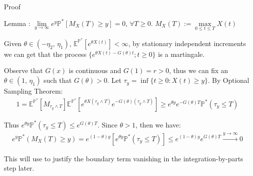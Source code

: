 \documentclass{beamer}
\begin{document}
\begin{frame}{Proof}

    {\footnotesize \footnotesize
    \par Lemma :  \(\lim\limits_{y\to\infty}e^{y}\mathbb{P}^{*}[M_{X}(T)\geq y]=0\), \(\forall T\geq 0\). \(M_{X}(T):=\max\limits_{0\leq t\leq T}X(t)\)
    \par [Proof]
    \vspace{1em}
    \par Given \(\theta\in(-\eta_{2},\,\eta_{1})\), $\mathbb{E}^{\mathbb{P}^*}[e^{\theta X(t)}]<\infty$, 
    by stationary independent increments we can get that the process \(\{e^{\theta X(t)-G(\theta)t}; t\geq 0\}\) is a martingale.
     \vspace{1em}
    \par  \pause Observe that $G(x)$ is continuous and \(G(1)=r>0\), thus we can fix an \(\theta\in(1,\,\eta_{1})\) such that \(G(\theta)>0\).
     Let $\tau_y = \inf\{t \geq 0 : X(t) \geq y\}$. By Optional Sampling Theorem:
      \vspace{1em}
    \begin{align*}
      1 = \mathbb{E}^{\mathbb{P}^*}[M_{\tau_y \land T}]  \mathbb{E}^{\mathbb{P}^*} \left[ e^{\theta X(\tau_y \land T)} e^{-G(\theta)(\tau_y \land T)} \right] 
      \geq e^{\theta y} e^{-G(\theta)T} \mathbb{P}^* (\tau_y \leq T)
    \end{align*}
     \vspace{1em}
    \par  \pause Thus $e^{\theta y} \mathbb{P}^* (\tau_y \leq T) \leq e^{G(\theta)T}$. Since $\theta > 1$, then we have:
     \vspace{1em}
    \begin{align*}
      e^y \mathbb{P}^* (M_X(T) \geq y) = 
      e^{(1-\theta)y} \left[ e^{\theta y} \mathbb{P}^* (\tau_y \leq T) \right] \leq e^{(1-\theta)y} e^{G(\theta)T} \xrightarrow{y \to \infty} 0
    \end{align*}
    \par This will use to justify the boundary term vanishing in the integration-by-parts step later.
    }
    
\end{frame}
\end{document}
